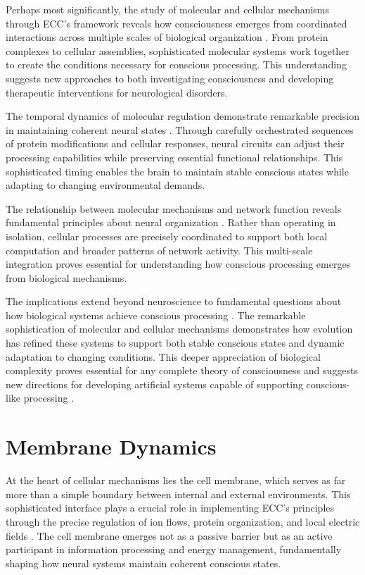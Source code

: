\begin{refsection}
Perhaps most significantly, the study of molecular and cellular mechanisms through ECC's framework reveals how consciousness emerges from coordinated interactions across multiple scales of biological organization \cite{Sudhof2018}. From protein complexes to cellular assemblies, sophisticated molecular systems work together to create the conditions necessary for conscious processing. This understanding suggests new approaches to both investigating consciousness and developing therapeutic interventions for neurological disorders.

The temporal dynamics of molecular regulation demonstrate remarkable precision in maintaining coherent neural states \cite{Namburi2016}. Through carefully orchestrated sequences of protein modifications and cellular responses, neural circuits can adjust their processing capabilities while preserving essential functional relationships. This sophisticated timing enables the brain to maintain stable conscious states while adapting to changing environmental demands.

The relationship between molecular mechanisms and network function reveals fundamental principles about neural organization \cite{Lisman2018}. Rather than operating in isolation, cellular processes are precisely coordinated to support both local computation and broader patterns of network activity. This multi-scale integration proves essential for understanding how conscious processing emerges from biological mechanisms.

The implications extend beyond neuroscience to fundamental questions about how biological systems achieve conscious processing \cite{Yu2018}. The remarkable sophistication of molecular and cellular mechanisms demonstrates how evolution has refined these systems to support both stable conscious states and dynamic adaptation to changing conditions. This deeper appreciation of biological complexity proves essential for any complete theory of consciousness and suggests new directions for developing artificial systems capable of supporting conscious-like processing \cite{Zador2019}.

\section{Membrane Dynamics}

At the heart of cellular mechanisms lies the cell membrane, which serves as far more than a simple boundary between internal and external environments. This sophisticated interface plays a crucial role in implementing ECC's principles through the precise regulation of ion flows, protein organization, and local electric fields \cite{Andersen1992}. The cell membrane emerges not as a passive barrier but as an active participant in information processing and energy management, fundamentally shaping how neural systems maintain coherent conscious states.


\end{refsection}

